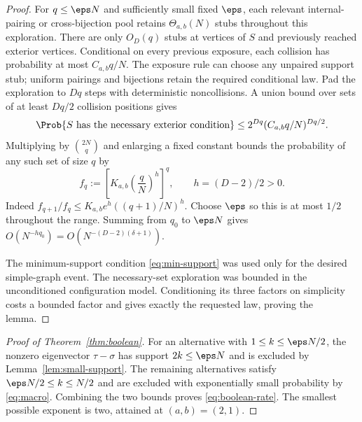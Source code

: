 \begin{proof}
For $q\le\eps N$ and sufficiently small fixed $\eps$, each relevant
internal-pairing or cross-bijection pool retains $\Theta_{a,b}(N)$
stubs throughout this exploration. There are only $O_D(q)$ stubs at
vertices of $S$ and previously reached exterior vertices. Conditional
on every previous exposure, each collision has probability at most
$C_{a,b}q/N$. The exposure rule can choose any unpaired support stub;
uniform pairings and bijections retain the required conditional law.
Pad the exploration to $Dq$ steps with deterministic noncollisions.
A union bound over sets of at least $Dq/2$ collision positions gives
\[
 \Prob\{S\text{ has the necessary exterior condition}\}
 \le2^{Dq}(C_{a,b}q/N)^{Dq/2}.
\]
Multiplying by $\binom{2N}{q}$ and enlarging a fixed constant bounds
the probability of any such set of size $q$ by
\begin{equation}\label{eq:collision-bound}
 f_q:=\left[K_{a,b}\left(\frac qN\right)^h\right]^q,
 \qquad h=(D-2)/2>0.
\end{equation}
Indeed
$f_{q+1}/f_q\le K_{a,b}e^h((q+1)/N)^h$.
Choose $\eps$ so this is at most $1/2$ throughout the range.
Summing from $q_0$ to $\eps N$ gives
$O(N^{-hq_0})=O(N^{-(D-2)(\delta+1)})$.

The minimum-support condition \eqref{eq:min-support} was used only
for the desired simple-graph event. The necessary-set exploration
was bounded in the unconditioned configuration model. Conditioning
its three factors on simplicity costs a bounded factor and gives
exactly the requested law, proving the lemma.
\end{proof}

\begin{proof}[Proof of Theorem~\ref{thm:boolean}]
For an alternative with $1\le k\le\eps N/2$, the nonzero eigenvector
$\tau-\sigma$ has support $2k\le\eps N$ and is excluded by
Lemma~\ref{lem:small-support}. The remaining alternatives satisfy
$\eps N/2\le k\le N/2$ and are excluded with exponentially small
probability by \eqref{eq:macro}. Combining the two bounds proves
\eqref{eq:boolean-rate}. The smallest possible exponent is two,
attained at $(a,b)=(2,1)$.
\end{proof}

